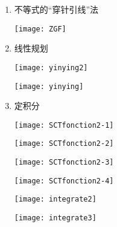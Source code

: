 \documentclass[
  paper=a4,
  pagesize=pdftex,
  twoside=false,
  toc=listof,
  BCOR=0pt,
  DIV=15,
  indent,
]{scrartcl}
\begin{document}
\begin{enumerate}
  \item 不等式的“穿针引线”法

  \begin{minipage}[c]{0.485\linewidth}
   
\end{minipage}
\begin{minipage}[c]{0.485\linewidth}
  \centering
 \texttt{[image: ZGF]}
\end{minipage}

\item 线性规划

   

{\centering
   \texttt{[image: yinying2]}
}

\begin{minipage}[c]{0.485\linewidth}
   
\end{minipage}
\begin{minipage}[c]{0.485\linewidth}
  \centering
 \texttt{[image: yinying]}
\end{minipage}

\item 定积分

   

{\centering
   \texttt{[image: SCTfonction2-1]}
}


   

{\centering
   \texttt{[image: SCTfonction2-2]}
}

   

{\centering
   \texttt{[image: SCTfonction2-3]}
}

   

{\centering
   \texttt{[image: SCTfonction2-4]}
}




   

\begin{minipage}[c]{0.485\linewidth}
   \texttt{[image: integrate2]}\\
\end{minipage}\hfill
\begin{minipage}[c]{0.485\linewidth}
  \centering
\texttt{[image: integrate3]}
\end{minipage}




\end{enumerate}
\end{document}
